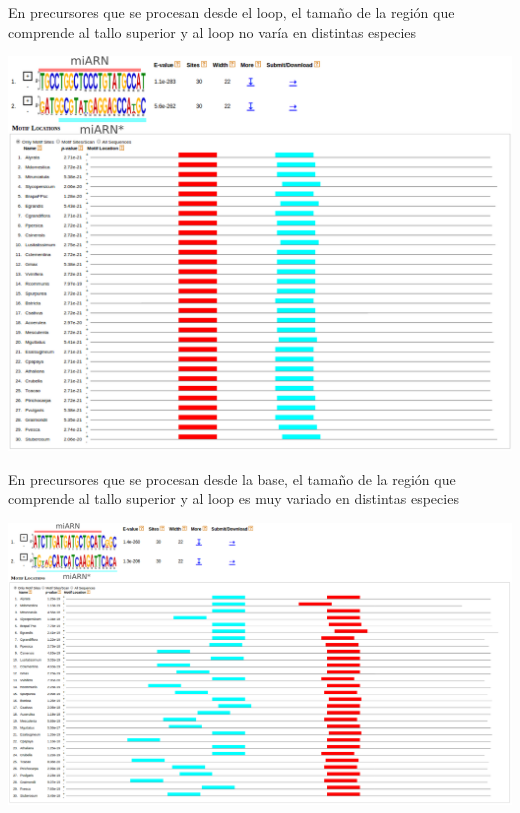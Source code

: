 \documentclass{beamer}
\begin{document}
\begin{frame}{En precursores que se procesan desde el loop, el tamaño de la región que comprende al tallo superior y al loop no varía en distintas especies}

	\begin{center}
		\includegraphics[width=.8\textwidth]{img/miR160a_meme.png}
	\end{center}
\end{frame}

\begin{frame}{En precursores que se procesan desde la base, el tamaño de la región que comprende al tallo superior y al loop es muy variado en distintas especies}
	\begin{center}
		\includegraphics[width=1\textwidth]{img/miR172_meme.png}
	\end{center}
\end{frame}
\end{document}
